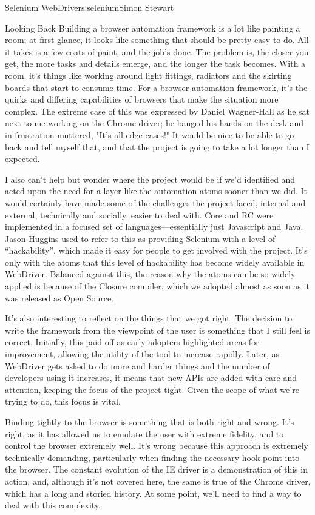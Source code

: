 \begin{aosachapter}{Selenium WebDriver}{s:selenium}{Simon Stewart}
\begin{aosasect1}{Looking Back}
Building a browser automation framework is a lot like painting a room;
at first glance, it looks like something that should be pretty easy to
do.  All it takes is a few coats of paint, and the job's done. The
problem is, the closer you get, the more tasks and details emerge, and
the longer the task becomes. With a room, it's things like working
around light fittings, radiators and the skirting boards that start to
consume time.  For a browser automation framework, it's the quirks and
differing capabilities of browsers that make the situation more
complex. The extreme case of this was expressed by Daniel Wagner-Hall
as he sat next to me working on the Chrome driver; he banged his hands
on the desk and in frustration muttered, "It's all edge cases!" It
would be nice to be able to go back and tell myself that, and that the
project is going to take a lot longer than I expected.

I also can't help but wonder where the project would be if we'd
identified and acted upon the need for a layer like the automation
atoms sooner than we did. It would certainly have made some of the
challenges the project faced, internal and external, technically and
socially, easier to deal with. Core and RC were implemented in a
focused set of languages---essentially just Javascript and Java. Jason
Huggins used to refer to this as providing Selenium with a level of
``hackability'', which made it easy for people to get involved with
the project. It's only with the atoms that this level of hackability
has become widely available in WebDriver. Balanced against this, the
reason why the atoms can be so widely applied is because of the
Closure compiler, which we adopted almost as soon as it was released
as Open Source.

It's also interesting to reflect on the things that we got right. The
decision to write the framework from the viewpoint of the user is
something that I still feel is correct. Initially, this paid off as
early adopters highlighted areas for improvement, allowing the utility
of the tool to increase rapidly. Later, as WebDriver gets asked to do
more and harder things and the number of developers using it
increases, it means that new APIs are added with care and attention,
keeping the focus of the project tight. Given the scope of what we're
trying to do, this focus is vital.

Binding tightly to the browser is something that is both right and
wrong.  It's right, as it has allowed us to emulate the user with
extreme fidelity, and to control the browser extremely well. It's
wrong because this approach is extremely technically demanding,
particularly when finding the necessary hook point into the
browser. The constant evolution of the IE driver is a demonstration of
this in action, and, although it's not covered here, the same is true
of the Chrome driver, which has a long and storied history. At some
point, we'll need to find a way to deal with this complexity.


\end{aosasect1}
\end{aosachapter}
